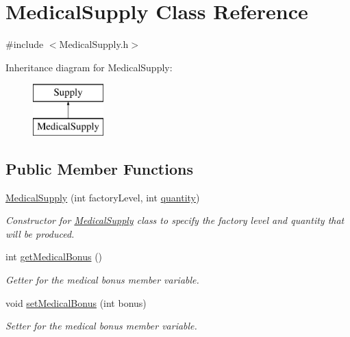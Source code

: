 \hypertarget{class_medical_supply}{}\section{Medical\+Supply Class Reference}
\label{class_medical_supply}


{\ttfamily \#include $<$Medical\+Supply.\+h$>$}

Inheritance diagram for Medical\+Supply\+:\begin{figure}[H]
\begin{center}
\leavevmode
\includegraphics[height=2.000000cm]{class_medical_supply}
\end{center}
\end{figure}
\subsection*{Public Member Functions}
\begin{DoxyCompactItemize}
\item 
\mbox{\hyperlink{class_medical_supply_aa7b8f6fe340a4579a5a6d09b17e426ef}{Medical\+Supply}} (int factory\+Level, int \mbox{\hyperlink{class_supply_a947a0ffbf0c36dc21d79c05f1a9f48a4}{quantity}})
\begin{DoxyCompactList}\small\item\em Constructor for \mbox{\hyperlink{class_medical_supply}{Medical\+Supply}} class to specify the factory level and quantity that will be produced. \end{DoxyCompactList}\item 
int \mbox{\hyperlink{class_medical_supply_accd0925a397355951d782a43eb8a0d55}{get\+Medical\+Bonus}} ()
\begin{DoxyCompactList}\small\item\em Getter for the medical bonus member variable. \end{DoxyCompactList}\item 
void \mbox{\hyperlink{class_medical_supply_a7dfad8dcb02fa936a063fb1a430c5f42}{set\+Medical\+Bonus}} (int bonus)
\begin{DoxyCompactList}\small\item\em Setter for the medical bonus member variable. \end{DoxyCompactList}\end{DoxyCompactItemize}
